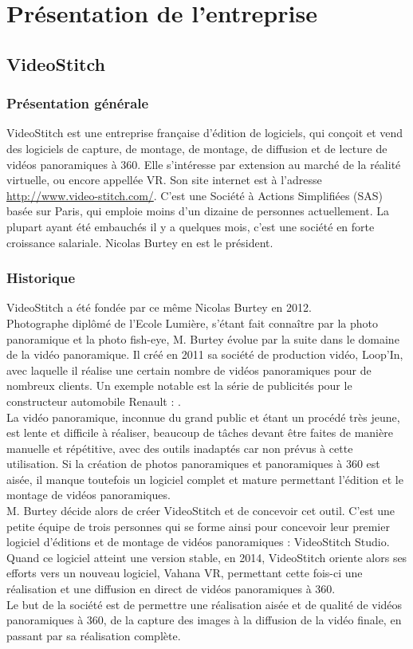 \chapter{Présentation de l'entreprise}
\section{VideoStitch}
\subsection{Présentation générale}
VideoStitch est une entreprise française d'édition de logiciels, qui conçoit et vend des logiciels de capture, de montage, de montage, de diffusion et de lecture de vidéos panoramiques à 360\°. Elle s'intéresse par extension au marché de la réalité virtuelle, ou encore appellée VR.
Son site internet est à l'adresse \url{http://www.video-stitch.com/}.
C'est une Société à Actions Simplifiées (SAS) basée sur Paris, qui emploie moins d'un dizaine de personnes actuellement. 
La plupart ayant été embauchés il y a quelques mois, c'est une société en forte croissance salariale. 
Nicolas Burtey en est le président.

\subsection{Historique}
VideoStitch a été fondée par ce même Nicolas Burtey en 2012.\\
Photographe diplômé de l'Ecole Lumière, s'étant fait connaître par la photo panoramique et la photo fish-eye, M. Burtey évolue par la suite dans le domaine de la vidéo panoramique. 
Il créé en 2011 sa société de production vidéo, Loop'In, avec laquelle il réalise une certain nombre de vidéos panoramiques pour de nombreux clients.
Un exemple notable est la série de publicités pour le constructeur automobile Renault : \url{}.\\
La vidéo panoramique, inconnue du grand public et étant un procédé très jeune, est lente et difficile à réaliser, beaucoup de tâches devant être faites de manière manuelle et répétitive, avec des outils inadaptés car non prévus à cette utilisation.
Si la création de photos panoramiques et panoramiques à 360\° est aisée, il manque toutefois un logiciel complet et mature permettant l'édition et le montage de vidéos panoramiques.\\
M. Burtey décide alors de créer VideoStitch et de concevoir cet outil. C'est une petite équipe de trois personnes qui se forme ainsi pour concevoir leur premier logiciel d'éditions et de montage de vidéos panoramiques : VideoStitch Studio.\\
Quand ce logiciel atteint une version stable, en 2014, VideoStitch oriente alors ses efforts vers un nouveau logiciel, Vahana VR, permettant cette fois-ci une réalisation et une diffusion en direct de vidéos panoramiques à 360\°.\\
\newline
Le but de la société est de permettre une réalisation aisée et de qualité de vidéos panoramiques à 360\°, de la capture des images à la diffusion de la vidéo finale, en passant par sa réalisation complète.


